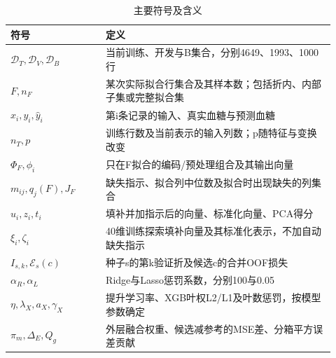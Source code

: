\begin{table}[htbp]
\small
\setlength{\tabcolsep}{5pt}
\centering
\caption{主要符号及含义}
\label{tab:symbols}
\begin{tabular}{L{0.27\linewidth}L{0.65\linewidth}}
\toprule
符号 & 定义 \\
\midrule
$\mathcal D_T,\mathcal D_V,\mathcal D_B$ & 当前训练、开发与B集合，分别4649、1993、1000行 \\
$F,n_F$ & 某次实际拟合行集合及其样本数；包括折内、内部子集或完整拟合集 \\
$x_i,y_i,\hat y_i$ & 第i条记录的输入、真实血糖与预测血糖 \\
$n_T,p$ & 训练行数及当前表示的输入列数；p随特征与变换改变 \\
$\Phi_F,\phi_i$ & 只在F拟合的编码/预处理组合及其输出向量 \\
$m_{ij},q_j(F),J_F$ & 缺失指示、拟合列中位数及拟合时出现缺失的列集合 \\
$u_i,z_i,t_i$ & 填补并加指示后的向量、标准化向量、PCA得分 \\
$\xi_i,\zeta_i$ & 40维训练探索填补向量及其标准化表示，不加自动缺失指示 \\
$I_{s,k},\mathcal E_s(c)$ & 种子s的第k验证折及候选c的合并OOF损失 \\
$\alpha_R,\alpha_L$ & Ridge与Lasso惩罚系数，分别100与0.05 \\
$\eta,\lambda_X,a_X,\gamma_X$ & 提升学习率、XGB叶权L2/L1及叶数惩罚，按模型参数确定 \\
$\pi_m,\Delta_E,Q_g$ & 外层融合权重、候选减参考的MSE差、分箱平方误差贡献 \\
\bottomrule
\end{tabular}
\end{table}
